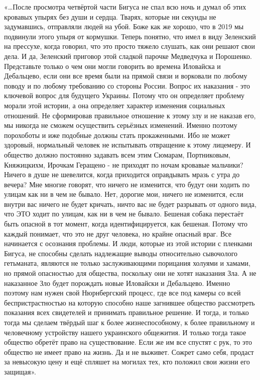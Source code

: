 «…После просмотра четвёртой части Бигуса не спал всю ночь и думал об этих
кровавых упырях без души и сердца. Тварях, которые ни секунды не задумавшись,
отправляли людей на убой. Боже как же хорошо, что в 2019 мы подвинули этого
упыря от кормушки. Теперь понятно, что имел в виду Зеленский на прессухе, когда
говорил, что это просто тяжело слушать, как они решают свои дела. И да,
Зеленский приговор этой сладкой парочке Медведчука и Порошенко. Представьте
только о чем они могли говорить во времена Иловайска и Дебальцево, если они все
время были на прямой связи и ворковали по любому поводу и по любому требованию
со стороны России. Вопрос их наказания - это ключевой вопрос для будущего
Украины. Потому что он определяет проблему морали этой истории, а она
определяет характер изменения социальных отношений. Не сформировав правильное
отношение к этому злу и не наказав его, мы никогда не сможем осуществить
серьёзных изменений. Именно поэтому порохоботы и иже подобные должны стать
прокаженными. Ибо не может здоровый, нормальный человек не испытывать
отвращение к этому лицемеру. И общество должно постоянно задавать всем этим
Сюмарам, Портниковым, Княжицкихм, Ирочкам Геращено - не приходят по ночам
кровавые мальчики? Ничего в душе не шевелится, когда приходится оправдывать
мразь с утра до вечера? Мне многие говорят, что ничего не изменится, что будут
они ходить по улицам как ни в чем не бывало. Нет, дорогие мои, ничего не
изменится, если внутри вас ничего не будет кричать, ничто вас не будет
разрывать от одного вида, что ЭТО ходит по улицам, как ни в чем не бывало.
Бешеная собака перестаёт быть опасной в тот момент, когда идентифицируется, как
бешеная. Потому что каждый понимает, что это не друг человека, но крайне
опасный враг. Все начинается с осознания проблемы. И люди, которые из этой
истории  с пленками Бигуса, не способны сделать надлежащие выводы относительно
сывочолого гетьманата, являются не только заслуживающими порицания холуями и
хамами, но прямой опасностью для общества, поскольку они не хотят наказания
Зла. А не наказанное Зло будет порождать новые Иловайски и Дебальцево. Именно
поэтому нам нужен свой Нюрнбергский процесс, где все под камеры со всей
беспристрастностью на которую способно наше загнившее общество рассмотреть
показания всех свидетелей и принимать правильное решение. И тогда, и только
тогда мы сделаем твёрдый шаг к более жизнеспособному, к более правильному и
человечному устройству нашего украинского общежития. И только тогда такое
общество обретёт право на существование. Если же им все спустят с рук, то это
общество не имеет право на жизнь. Да и не выживет. Сожрет само себя, продаст за
невысокую цену и ещё спляшет на могилах тех, кто положил свои жизни его
защищая». 

